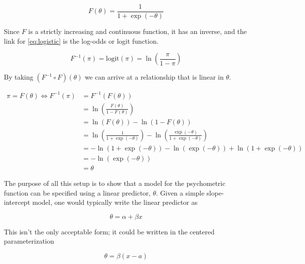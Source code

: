 \documentclass[11pt, oneside, openany]{scrbook}
\begin{document}

\begin{equation}
  F(\theta) = \frac{1}{1 + \exp\left(-\theta\right)}
  \label{eq:logistic}
\end{equation}

Since \(F\) is a strictly increasing and continuous function, it has an inverse, and the link for \eqref{eq:logistic} is the log-odds or logit function.


\begin{equation}
  F^{-1}(\pi) = \mathrm{logit}(\pi) = \ln\left(\frac{\pi}{1 - \pi}\right)
  \label{eq:logit}
\end{equation}

By taking \((F^{-1} \circ F)(\theta)\) we can arrive at a relationship that is linear in \(\theta\).


\begin{align*}
  \pi = F(\theta) \Longleftrightarrow F^{-1}(\pi) &= F^{-1}(F(\theta)) \\
  & = \ln\left(\frac{F(\theta)}{1 - F(\theta)}\right) \\
  &= \ln(F(\theta)) - \ln(1 - F(\theta)) \\
  &= \ln\left(\frac{1}{1 + \exp(-\theta)}\right) - \ln\left(\frac{\exp(-\theta)}{1 + \exp(-\theta)}\right) \\
  &= - \ln(1 + \exp(-\theta)) - \ln(\exp(-\theta)) + \ln(1 + \exp(-\theta)) \\
  &= - \ln(\exp(-\theta)) \\
  &= \theta
\end{align*}

The purpose of all this setup is to show that a model for the psychometric function can be specified using a linear predictor, \(\theta\). Given a simple slope-intercept model, one would typically write the linear predictor as


\begin{equation}
  \theta = \alpha + \beta x
  \label{eq:linearform1}
\end{equation}

This isn't the only acceptable form; it could be written in the centered parameterization


\begin{equation}
  \theta = \beta(x - a)
  \label{eq:linearform2}
\end{equation}
\end{document}
